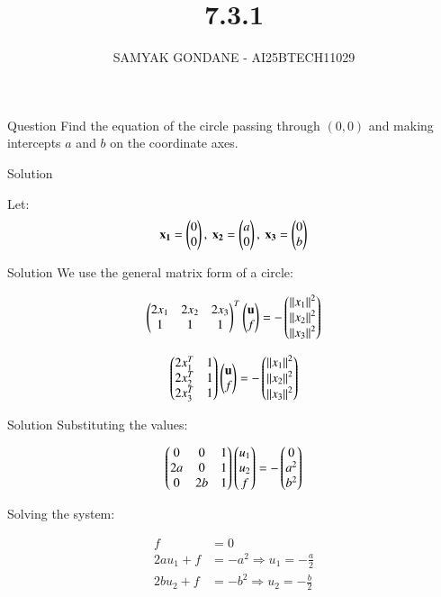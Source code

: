 \documentclass{beamer}
\title 
{7.3.1}
\date{}
\author
{SAMYAK GONDANE - AI25BTECH11029}
\begin{document}
\frame{\titlepage}

\begin{frame}{Question}
Find the equation of the circle passing through $(0, 0)$ and making intercepts $a$ and $b$ on the coordinate axes.
\end{frame}


\begin{frame}{Solution}

Let:
\begin{align}
\mathbf{x_1} = \begin{pmatrix}0 \\ 0\end{pmatrix},\ \mathbf{x_2} = \begin{pmatrix}a \\ 0\end{pmatrix},\ \mathbf{x_3} = \begin{pmatrix}0 \\ b\end{pmatrix}
\end{align}
\end{frame}

\begin{frame}{Solution}
We use the general matrix form of a circle:


\begin{align}
\begin{pmatrix}2x_1 & 2x_2 & 2x_3\\
1 & 1 & 1\end{pmatrix}^T \begin{pmatrix}\mathbf{u} \\ f\end{pmatrix} = - \begin{pmatrix}\left\lVert x_1\right\rVert^2 \\ \left\lVert x_2\right\rVert^2 \\ \left\lVert x_3\right\rVert^2\end{pmatrix}
\end{align}


\begin{align}
\begin{pmatrix}
2x_1^T & 1 \\
2x_2^T & 1 \\
2x_3^T & 1
\end{pmatrix}
\begin{pmatrix}
\mathbf{u} \\
f
\end{pmatrix}
=
- \begin{pmatrix}
\left\lVert x_1\right\rVert^2 \\
\left\lVert x_2\right\rVert^2 \\
\left\lVert x_3\right\rVert^2
\end{pmatrix}
\end{align}
\end{frame}

\begin{frame}{Solution}
Substituting the values:

\begin{align}
\begin{pmatrix}
0 & 0 & 1 \\
2a & 0 & 1 \\
0 & 2b & 1
\end{pmatrix}
\begin{pmatrix}
u_1 \\
u_2 \\
f
\end{pmatrix}
=
- \begin{pmatrix}
0 \\
a^2 \\
b^2
\end{pmatrix}
\end{align}


Solving the system:

\begin{align*}
f &= 0 \\
2a u_1 + f &= -a^2 \Rightarrow u_1 = -\frac{a}{2} \\
2b u_2 + f &= -b^2 \Rightarrow u_2 = -\frac{b}{2}
\end{align*}
\end{frame}
\end{document}
